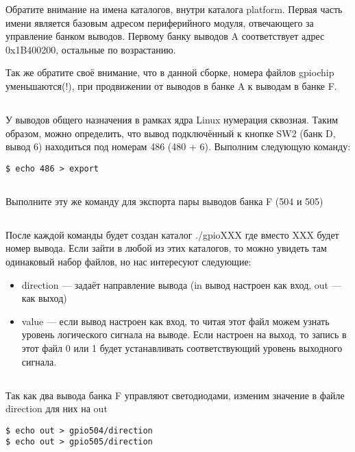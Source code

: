Обратите внимание на имена каталогов, внутри каталога platform. Первая часть имени является базовым адресом периферийного модуля, отвечающего за управление банком выводов. Первому банку выводов A соответствует адрес 0x1B400200, остальные по возрастанию. 

Так же обратите своё внимание, что в данной сборке, номера файлов gpiochip уменьшаются(!), при продвижении от выводов в банке A к выводам в банке F.

\subsection{}У выводов общего назначения в рамках ядра Linux нумерация сквозная. Таким образом, можно определить, что вывод подключённый к кнопке SW2 (банк D, вывод 6) находиться под номерам 486 (480 + 6).  Выполним следующую команду:
\begin{lstlisting}[style=bash]
$ echo 486 > export
\end{lstlisting}

\subsection{}Выполните эту же команду для экспорта пары выводов банка F (504 и 505) 

\subsection{}После каждой команды будет создан каталог ./gpioXXX где вместо XXX будет номер вывода. Если зайти в любой из этих каталогов, то можно увидеть там одинаковый набор файлов, но нас интересуют следующие: 
\begin{itemize}
\item direction — задаёт направление вывода (in вывод настроен как вход, out — как выход)
\item value — если вывод настроен как вход, то читая этот файл можем узнать уровень логического сигнала на выводе. Если настроен на выход, то запись в этот файл 0 или 1 будет устанавливать соответствующий уровень выходного сигнала.
\end{itemize}

\subsection{}Так как два вывода банка F управляют светодиодами, изменим значение в файле direction  для них на out
\begin{lstlisting}[style=bash]
$ echo out > gpio504/direction
$ echo out > gpio505/direction
\end{lstlisting}

